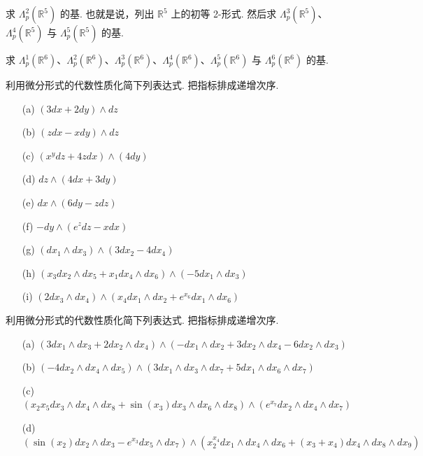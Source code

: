\begin{question}\label{q:3-37}
求 $\Lambda_p^2(\mathbb{R}^5)$ 的基. 也就是说，列出 $\mathbb{R}^5$ 上的初等 2-形式. 然后求 $\Lambda_p^3(\mathbb{R}^5)$、$\Lambda_p^4(\mathbb{R}^5)$ 与 $\Lambda_p^5(\mathbb{R}^5)$ 的基.
\end{question}

\begin{question}\label{q:3-38}
求 $\Lambda_p^1(\mathbb{R}^6)$、$\Lambda_p^2(\mathbb{R}^6)$、$\Lambda_p^3(\mathbb{R}^6)$、$\Lambda_p^4(\mathbb{R}^6)$、$\Lambda_p^5(\mathbb{R}^6)$ 与 $\Lambda_p^6(\mathbb{R}^6)$ 的基.
\end{question}

\begin{question}\label{q:3-39}
利用微分形式的代数性质化简下列表达式. 把指标排成递增次序.
\begin{enumerate}
  \item[(a)] $(3dx+2dy)\wedge dz$
  \item[(b)] $(zdx-xdy)\wedge dz$
  \item[(c)] $\left(x^ydz+4zdx\right)\wedge(4dy)$
  \item[(d)] $dz\wedge(4dx+3dy)$
  \item[(e)] $dx\wedge(6dy-zdz)$
  \item[(f)] $-dy\wedge\left(e^zdz-xdx\right)$
  \item[(g)] $(dx_1\wedge dx_3)\wedge(3dx_2-4dx_4)$
  \item[(h)] $\left(x_3dx_2\wedge dx_5+x_1dx_4\wedge dx_6\right)\wedge(-5dx_1\wedge dx_3)$
  \item[(i)] $(2dx_3\wedge dx_4)\wedge\left(x_4dx_1\wedge dx_2+e^{x_6}dx_1\wedge dx_6\right)$
\end{enumerate}
\end{question}

\begin{question}\label{q:3-40}
利用微分形式的代数性质化简下列表达式. 把指标排成递增次序.
\begin{enumerate}
  \item[(a)] $(3dx_1\wedge dx_3+2dx_2\wedge dx_4)\wedge(-dx_1\wedge dx_2+3dx_2\wedge dx_4-6dx_2\wedge dx_3)$
  \item[(b)] $(-4dx_2\wedge dx_4\wedge dx_5)\wedge(3dx_1\wedge dx_3\wedge dx_7+5dx_1\wedge dx_6\wedge dx_7)$
  \item[(c)] $\left(x_2x_5dx_3\wedge dx_4\wedge dx_8+\sin(x_3)dx_3\wedge dx_6\wedge dx_8\right)\wedge\left(e^{x_7}dx_2\wedge dx_4\wedge dx_7\right)$
  \item[(d)] $\left(\sin(x_2)dx_2\wedge dx_3-e^{x_3}dx_5\wedge dx_7\right)\wedge\left(x_2^{x_4}dx_1\wedge dx_4\wedge dx_6+(x_3+x_4)dx_4\wedge dx_8\wedge dx_9\right)$
\end{enumerate}
\end{question}


